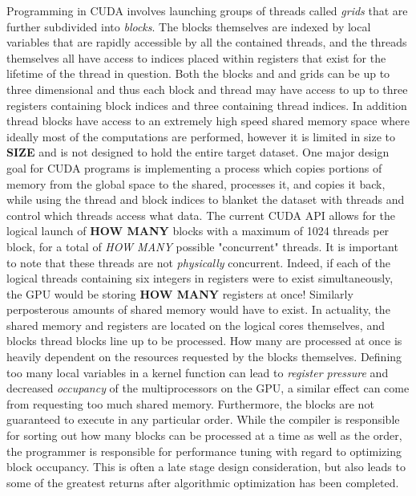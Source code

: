 \documentclass[paper=a4, fontsize=11pt]{scrartcl} %
\numberwithin{equation}{section} %
\numberwithin{figure}{section} %
\numberwithin{table}{section} %
\begin{document}
Programming in CUDA involves launching groups of threads called \textit{grids} that are further subdivided into \textit{blocks}. The blocks themselves are indexed by local variables that are rapidly accessible by all the contained threads, and the threads themselves all have access to indices placed within registers that exist for the lifetime of the thread in question. Both the blocks and and grids can be up to three dimensional and thus each block and thread may have access to up to three registers containing block indices and three containing thread indices. In addition thread blocks have access to an extremely high speed shared memory space where ideally most of the computations are performed, however it is limited in size to \textbf{SIZE} and is not designed to hold the entire target dataset. One major design goal for CUDA programs is implementing a process which copies portions of memory from the global space to the shared, processes it, and copies it back, while using the thread and block indices to blanket the dataset with threads and control which threads access what data. The current CUDA API allows for the logical launch of \textbf{HOW MANY} blocks with a maximum of 1024 threads per block, for a total of \textit{HOW MANY} possible "concurrent" threads. It is important to note that these threads are not \textit{physically} concurrent. Indeed, if each of the logical threads containing six integers in registers were to exist simultaneously, the GPU would be storing \textbf{HOW MANY} registers at once! Similarly perposterous amounts of shared memory would have to exist. In actuality, the shared memory and registers are located on the logical cores themselves, and blocks thread blocks line up to be processed. How many are processed at once is heavily dependent on the resources requested by the blocks themselves. Defining too many local variables in a kernel function can lead to \textit{register pressure} and decreased \textit{occupancy} of the multiprocessors on the GPU, a similar effect can come from requesting too much shared memory. Furthermore, the blocks are not guaranteed to execute in any particular order. While the compiler is responsible for sorting out how many blocks can be processed at a time as well as the order, the programmer is responsible for performance tuning with regard to optimizing block occupancy. This is often a late stage design consideration, but also leads to some of the greatest returns after algorithmic optimization has been completed.    
\end{document}
